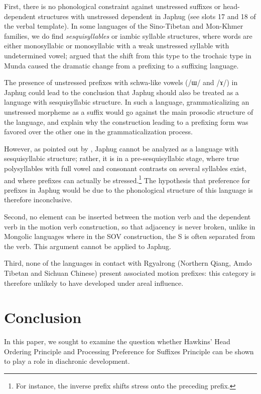 \documentclass[oldfontcommands,twoside,a4paper,12pt]{article}
\begin{document}
First, there is no phonological constraint against unstressed suffixes or head-dependent structures with unstressed dependent in Japhug (see slots 17 and 18 of the verbal template). In some languages of the Sino-Tibetan and Mon-Khmer families, we do find \textit{sesquisyllables} or iambic syllable structures, where words are either monosyllabic or monosyllabic with a weak unstressed syllable with undetermined vowel; \citet{donegan04munda} argued that the shift from this type to the trochaic type in Munda caused the dramatic change from a prefixing to a suffixing language. 

The presence of unstressed prefixes with schwa-like vowels (/ɯ/ and /ɤ/) in Japhug could lead to the conclusion that Japhug  should also be treated as a language with sesquisyllabic structure. In such a language, grammaticalizing an unstressed morpheme as a suffix would go against the main prosodic structure of the language, and explain why the construction leading to a prefixing form was favored over the other one in the grammaticalization process.

However, as pointed out by \citet{michaud12mono}, Japhug cannot be analyzed as a language with sesquisyllabic structure; rather, it is in a pre-sesquisyllabic stage, where true polysyllables with full vowel and consonant contrasts on several syllables exist, and where prefixes can actually be stressed.\footnote{For instance, the inverse prefix shifts stress onto the preceding prefix.} The hypothesis that preference for prefixes in Japhug would be due to the phonological structure of this language is therefore inconclusive.

Second, no element can be inserted between the motion verb and the dependent verb in the motion verb construction, so that adjacency is never broken, unlike in Mongolic languages where in the SOV construction, the S is often separated from the verb. This argument cannot be applied to Japhug.
 
Third, none of the languages in contact with Rgyalrong (Northern Qiang, Amdo Tibetan and Sichuan Chinese) present associated motion prefixes: this category is therefore unlikely to have developed under areal influence.


 
\section{Conclusion}
In this paper, we sought to examine the question whether Hawkins' Head Ordering Principle and Processing Preference for Suffixes Principle can be shown to play a role in diachronic development.
\end{document}

